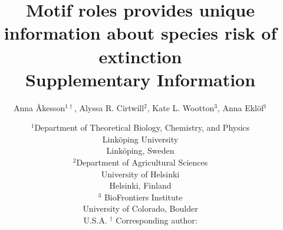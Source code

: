 \documentclass[12pt]{article}
\begin{document}
 

\title{Motif roles provides unique information about species risk of extinction\\ \medskip Supplementary Information}


\author{Anna \r{A}kesson$^{1\dagger}$, Alyssa R. Cirtwill$^{2}$, Kate L. Wootton$^{3}$, Anna Ekl\"{o}f$^{1}$} 
\date{\small$^1$Department of Theoretical Biology, Chemistry, and Physics\\ 
Link\"{o}ping University\\
Link\"{o}ping, Sweden\\
\medskip
\small$^2$Department of Agricultural Sciences\\
University of Helsinki\\
Helsinki, Finland\\
\medskip
\small$^3$ BioFrontiers Institute\\
University of Colorado, Boulder\\
U.S.A.
\medskip
$^\dagger$ Corresponding author:\\
}



\maketitle 
\raggedright
\end{document}
